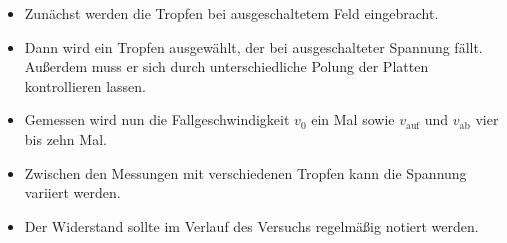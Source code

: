 \begin{itemize}
  \item Zunächst werden die Tropfen bei ausgeschaltetem Feld eingebracht.
  \item Dann wird ein Tropfen ausgewählt, der bei ausgeschalteter Spannung fällt.
  Außerdem muss er sich durch unterschiedliche Polung der Platten kontrollieren
  lassen.
  \item Gemessen wird nun die Fallgeschwindigkeit $v_0$ ein Mal sowie
  $v_\text{auf}$ und $v_\text{ab}$ vier bis zehn Mal.
  \item Zwischen den Messungen mit verschiedenen Tropfen kann die
  Spannung variiert werden.
  \item Der Widerstand sollte im Verlauf des Versuchs regelmäßig notiert werden.
\end{itemize}
